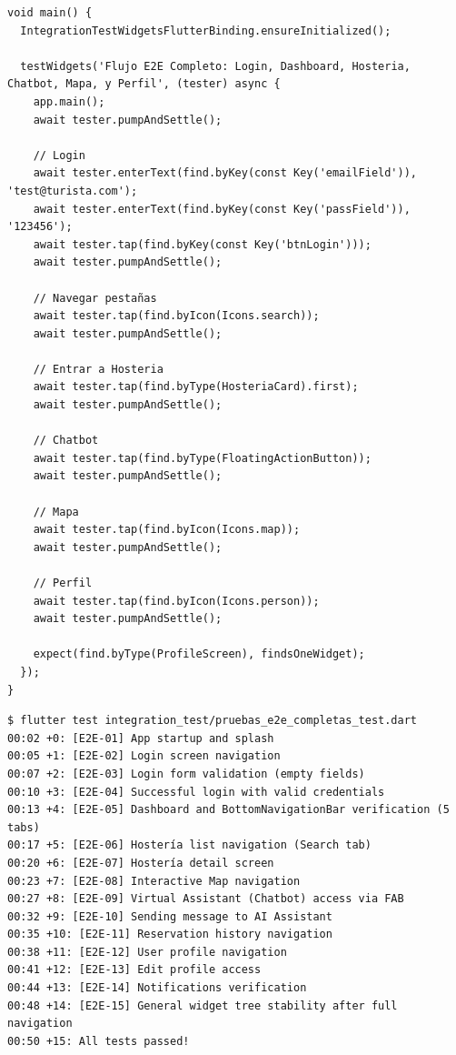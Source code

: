 \documentclass[12pt,letterpaper]{report}
\begin{document}
\begin{lstlisting}[style=codeblock,caption={Ejemplo de Prueba de Integración E2E comprensiva controlando el dispositivo real.}]
void main() {
  IntegrationTestWidgetsFlutterBinding.ensureInitialized();

  testWidgets('Flujo E2E Completo: Login, Dashboard, Hosteria, Chatbot, Mapa, y Perfil', (tester) async {
    app.main();
    await tester.pumpAndSettle();

    // Login
    await tester.enterText(find.byKey(const Key('emailField')), 'test@turista.com');
    await tester.enterText(find.byKey(const Key('passField')), '123456');
    await tester.tap(find.byKey(const Key('btnLogin')));
    await tester.pumpAndSettle();

    // Navegar pestañas
    await tester.tap(find.byIcon(Icons.search));
    await tester.pumpAndSettle();
    
    // Entrar a Hosteria
    await tester.tap(find.byType(HosteriaCard).first);
    await tester.pumpAndSettle();
    
    // Chatbot
    await tester.tap(find.byType(FloatingActionButton));
    await tester.pumpAndSettle();
    
    // Mapa
    await tester.tap(find.byIcon(Icons.map));
    await tester.pumpAndSettle();
    
    // Perfil
    await tester.tap(find.byIcon(Icons.person));
    await tester.pumpAndSettle();

    expect(find.byType(ProfileScreen), findsOneWidget);
  });
}
\end{lstlisting}

\begin{lstlisting}[style=codeblock,caption={Salida en consola de la ejecución exitosa de los 15 tests E2E.}]
$ flutter test integration_test/pruebas_e2e_completas_test.dart
00:02 +0: [E2E-01] App startup and splash
00:05 +1: [E2E-02] Login screen navigation
00:07 +2: [E2E-03] Login form validation (empty fields)
00:10 +3: [E2E-04] Successful login with valid credentials
00:13 +4: [E2E-05] Dashboard and BottomNavigationBar verification (5 tabs)
00:17 +5: [E2E-06] Hostería list navigation (Search tab)
00:20 +6: [E2E-07] Hostería detail screen
00:23 +7: [E2E-08] Interactive Map navigation
00:27 +8: [E2E-09] Virtual Assistant (Chatbot) access via FAB
00:32 +9: [E2E-10] Sending message to AI Assistant
00:35 +10: [E2E-11] Reservation history navigation
00:38 +11: [E2E-12] User profile navigation
00:41 +12: [E2E-13] Edit profile access
00:44 +13: [E2E-14] Notifications verification
00:48 +14: [E2E-15] General widget tree stability after full navigation
00:50 +15: All tests passed!
\end{lstlisting}
\end{document}
